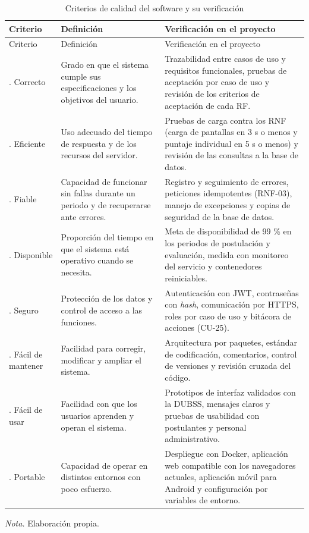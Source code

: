 \begin{longtable}{>{\raggedright\arraybackslash}p{2.8cm} >{\raggedright\arraybackslash}p{4.7cm} >{\raggedright\arraybackslash}p{5.3cm}}
\caption{Criterios de calidad del software y su verificación}\label{tab:criterios_calidad}\\
\toprule
Criterio & Definición & Verificación en el proyecto \\
\midrule
\endfirsthead
\toprule
Criterio & Definición & Verificación en el proyecto \\
\midrule
\endhead
\bottomrule
\endfoot
1. Correcto & Grado en que el sistema cumple sus especificaciones y los objetivos del usuario. & Trazabilidad entre casos de uso y requisitos funcionales, pruebas de aceptación por caso de uso y revisión de los criterios de aceptación de cada RF. \\
2. Eficiente & Uso adecuado del tiempo de respuesta y de los recursos del servidor. & Pruebas de carga contra los RNF (carga de pantallas en 3 s o menos y puntaje individual en 5 s o menos) y revisión de las consultas a la base de datos. \\
3. Fiable & Capacidad de funcionar sin fallas durante un periodo y de recuperarse ante errores. & Registro y seguimiento de errores, peticiones idempotentes (RNF-03), manejo de excepciones y copias de seguridad de la base de datos. \\
4. Disponible & Proporción del tiempo en que el sistema está operativo cuando se necesita. & Meta de disponibilidad de 99 \% en los periodos de postulación y evaluación, medida con monitoreo del servicio y contenedores reiniciables. \\
5. Seguro & Protección de los datos y control de acceso a las funciones. & Autenticación con JWT, contraseñas con \textit{hash}, comunicación por HTTPS, roles por caso de uso y bitácora de acciones (CU-25). \\
6. Fácil de mantener & Facilidad para corregir, modificar y ampliar el sistema. & Arquitectura por paquetes, estándar de codificación, comentarios, control de versiones y revisión cruzada del código. \\
7. Fácil de usar & Facilidad con que los usuarios aprenden y operan el sistema. & Prototipos de interfaz validados con la DUBSS, mensajes claros y pruebas de usabilidad con postulantes y personal administrativo. \\
8. Portable & Capacidad de operar en distintos entornos con poco esfuerzo. & Despliegue con Docker, aplicación web compatible con los navegadores actuales, aplicación móvil para Android y configuración por variables de entorno. \\
\end{longtable}
\noindent\textit{Nota.} Elaboración propia.

